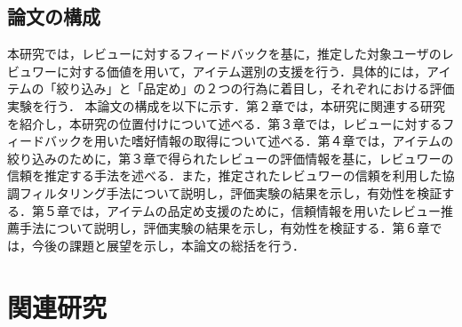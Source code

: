 \documentclass[a4paper,11pt,oneside,openany]{jsbook}
\begin{document}
	\section{論文の構成}
本研究では，レビューに対するフィードバックを基に，推定した対象ユーザのレビュワーに対する価値を用いて，アイテム選別の支援を行う．具体的には，アイテムの「絞り込み」と「品定め」の２つの行為に着目し，それぞれにおける評価実験を行う．
本論文の構成を以下に示す．第２章では，本研究に関連する研究を紹介し，本研究の位置付けについて述べる．第３章では，レビューに対するフィードバックを用いた嗜好情報の取得について述べる．第４章では，アイテムの絞り込みのために，第３章で得られたレビューの評価情報を基に，レビュワーの信頼を推定する手法を述べる．また，推定されたレビュワーの信頼を利用した協調フィルタリング手法について説明し，評価実験の結果を示し，有効性を検証する．第５章では，アイテムの品定め支援のために，信頼情報を用いたレビュー推薦手法について説明し，評価実験の結果を示し，有効性を検証する．第６章では，今後の課題と展望を示し，本論文の総括を行う．



\chapter{関連研究}
\end{document}
